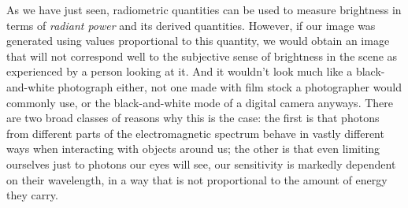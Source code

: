 As we have just seen, radiometric quantities can be used to measure brightness in 
terms of \emph{\gls{radiant power}} and its derived quantities.
However, if our image was generated using values proportional to this quantity,
we would obtain an image that will not correspond well to the subjective 
sense of brightness in the scene as experienced by a person looking at it. 
And it wouldn't look much like a black-and-white photograph either, not one made
with film stock a photographer would commonly use, or the black-and-white mode 
of a digital camera anyways.
There are two broad classes of reasons why this is the case: 
the first is that photons from different parts of the electromagnetic spectrum
behave in vastly different ways when interacting with objects around us;
the other is that even limiting ourselves just to photons our eyes will see,
our sensitivity is markedly dependent on their wavelength, in a way that is not
proportional to the amount of energy they carry. 

